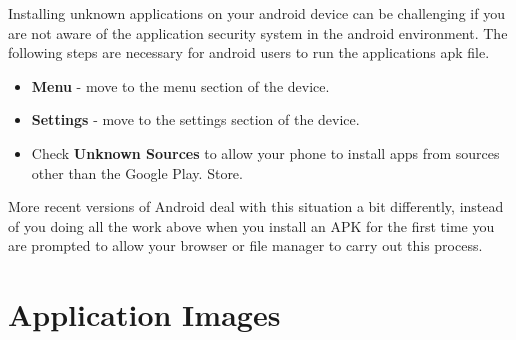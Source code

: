 \documentclass[a4paper,12pt]{report}
\begin{document}
Installing unknown applications on your android device can be challenging if you are not aware of the application security system in the android environment.
The following steps are necessary for android users to run the applications apk file.
\begin{itemize}
    \item \textbf{Menu} - move to the menu section of the device.
    \item \textbf{Settings} - move to the settings section of the device.
    \item Check \textbf{Unknown Sources} to allow your phone to install apps from sources other than the Google Play. Store.
\end{itemize}
More recent versions of Android deal with this situation a bit differently, instead of you doing all the work above when you install an APK for the first time you are prompted to allow your browser or file manager to carry out this process.\cite{apkFiles} \\
\newpage
\section{Application Images}
\end{document}
